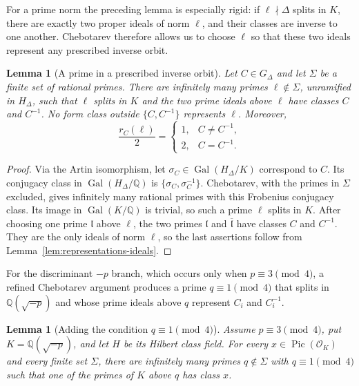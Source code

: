 \documentclass[10pt,a4paper]{amsart}
\newtheorem{lemma}[theorem]{Lemma}
\newcommand{\Q}{\mathbb{Q}}
\newcommand{\OO}{\mathcal{O}}
\newcommand{\Pic}{\operatorname{Pic}}
\newcommand{\Gal}{\operatorname{Gal}}
\begin{document}
For a prime norm the preceding lemma is especially rigid: if
$\ell\nmid\Delta$ splits in $K$, there are exactly two proper ideals of
norm $\ell$, and their classes are inverse to one another. Chebotarev
therefore allows us to choose $\ell$ so that these two ideals represent
any prescribed inverse orbit.

\begin{lemma}[A prime in a prescribed inverse orbit]\label{lem:prime-isolation}
Let $C\in G_\Delta$ and let $\Sigma$ be a finite set of rational primes.  There are infinitely many primes $\ell\notin\Sigma$, unramified in $H_\Delta$, such that $\ell$ splits in $K$ and the two prime ideals above $\ell$ have classes $C$ and $C^{-1}$.  No form class outside $\{C,C^{-1}\}$ represents $\ell$.  Moreover,
\[
  \frac{r_C(\ell)}2=
  \begin{cases}
    1,&C\ne C^{-1},\\
    2,&C=C^{-1}.
  \end{cases}
\]
\end{lemma}

\begin{proof}
Via the Artin isomorphism, let $\sigma_C\in\Gal(H_\Delta/K)$ correspond to $C$.  Its conjugacy class in $\Gal(H_\Delta/\Q)$ is $\{\sigma_C,\sigma_C^{-1}\}$.  Chebotarev, with the primes in $\Sigma$ excluded, gives infinitely many rational primes with this Frobenius conjugacy class.  Its image in $\Gal(K/\Q)$ is trivial, so such a prime $\ell$ splits in $K$.  After choosing one prime $\mathfrak l$ above $\ell$, the two primes $\mathfrak l$ and $\overline{\mathfrak l}$ have classes $C$ and $C^{-1}$.  They are the only ideals of norm $\ell$, so the last assertions follow from Lemma~\ref{lem:representations-ideals}.
\end{proof}

For the discriminant $-p$ branch, which occurs only when
$p\equiv3\pmod4$, a refined Chebotarev argument produces a prime
$q\equiv1\pmod4$ that splits in $\Q(\sqrt{-p})$ and whose prime ideals
above $q$ represent $C_i$ and $C_i^{-1}$.

\begin{lemma}[Adding the condition $q\equiv1\pmod4$]\label{lem:class-mod-four}
Assume $p\equiv3\pmod4$, put $K=\Q(\sqrt{-p})$, and let $H$ be its Hilbert class field. For every $x\in\Pic(\OO_K)$ and every finite set $\Sigma$, there are infinitely many primes $q\notin\Sigma$ with $q\equiv1\pmod4$ such that one of the primes of $K$ above $q$ has class $x$.
\end{lemma}
\end{document}
